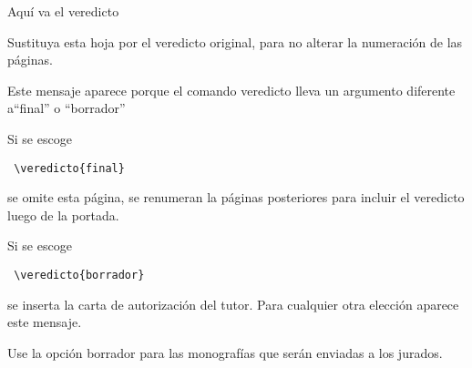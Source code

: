 \begin{center}
\Large Aquí va el veredicto


Sustituya esta hoja por el veredicto original, para no alterar la numeración de las páginas.


Este mensaje aparece porque el comando veredicto lleva un argumento diferente a``final'' o ``borrador''


Si se escoge \begin{verbatim} \veredicto{final} \end{verbatim} se omite esta página, se renumeran la páginas posteriores para incluir el veredicto luego de la portada. 

Si se escoge \begin{verbatim} \veredicto{borrador} \end{verbatim} se inserta la carta de autorización del tutor. Para cualquier otra elección aparece este mensaje.

Use la opción borrador para las monografías que serán enviadas a los jurados.

\end{center}
